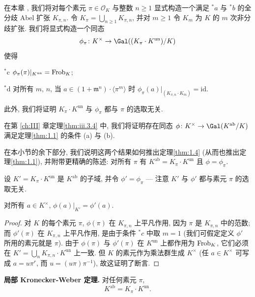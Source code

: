 在本章 , 我们将对每个素元 $\pi\in\mathcal{O}_K$ 与整数 $n\ge 1$ 显式构造一个满足 ${}^*a$ 与 ${}^*b$ 的全分歧 Abel 扩张 $K_{\pi,n}$. 令 $K_{\pi}=\bigcup_{n\ge 1}K_{\pi,n}$, 并对 $m\ge 1$ 令 $K_m$ 为 $K$ 的 $m$ 次非分歧扩张. 我们将显式构造一个同态
\[
\phi_{\pi}\colon K^{\times}\to\Gal((K_{\pi}\cdot K^{\mathrm{un}})/K)
\]
使得

${}^*\mathrm{c}$ $\phi_{\pi}(\pi)|_{K^{\mathrm{un}}}=\operatorname{Frob}_K$;

${}^*\mathrm{d}$ 对所有 $m$, $n$, 当 $a\in(1+\mathfrak{m}^n)\cdot\langle\pi^m\rangle$ 时 $\phi_{\pi}(a)|_{(K_{\pi,n}\cdot K_m)}=\mathrm{id}$.

此外, 我们将证明 $K_{\pi}\cdot K^{\mathrm{un}}$ 与 $\phi_{\pi}$ 都与 $\pi$ 的选取无关.

在第 \ref{ch:III} 章定理\ref{thm:iii.3.4} 中, 我们将证明存在同态 $\phi\colon K^{\times}\to\Gal(K^{\mathrm{ab}}/K)$ 满足定理\ref{thm:1.1} 的条件 (a) 与 (b).

在本小节的余下部分, 我们说明这两个结果如何推出定理\ref{thm:1.4} (从而也推出定理\ref{thm:1.1}), 并附带更精确的陈述: 对所有 $\pi$ 有 $K^{\mathrm{ab}}=K_{\pi}\cdot K^{\mathrm{un}}$ 且 $\phi=\phi_{\pi}$.

设 $K'=K_{\pi}\cdot K^{\mathrm{un}}$ 是 $K^{\mathrm{ab}}$ 的子域, 并令 $\phi'=\phi_{\pi}$ — 注意 $K'$ 与 $\phi'$ 都与素元 $\pi$ 的选取无关.

\begin{npara}\label{para:1.14}
对所有 $a\in K^{\times}$, $\phi(a)|_{K'}=\phi'(a)$.
\end{npara}

\begin{proof}
对 $K$ 的每个素元 $\pi$, $\phi(\pi)$ 在 $K_{\pi,n}$ 上平凡作用, 因为 $\pi$ 是 $K_{\pi,n}$ 中的范数; 而 $\phi'(\pi)$ 在 $K_{\pi,n}$ 上平凡作用, 是由于条件 ${}^*c$ 中取 $m=1$ (我们可假定定义 $\phi'$ 所用的素元就是 $\pi$). 由于 $\phi(\pi)$ 与 $\phi'(\pi)$ 在 $K^{\mathrm{un}}$ 上都作用为 $\operatorname{Frob}_K$, 它们必须在 $K'=\bigcup_n K_{\pi,n}\cdot K^{\mathrm{un}}$ 上一致. 但 $K$ 的素元作为乘法群生成 $K^{\times}$ (任 $a\in K^{\times}$ 可写成 $a=u\pi^r$, 而 $u=(u\pi)\pi^{-1}$), 故这证明了断言.
\end{proof}

\begin{npara}\label{para:1.15}
\textbf{局部 Kronecker-Weber 定理.} 对任何素元 $\pi$,
\[
K^{\mathrm{ab}}=K_{\pi}\cdot K^{\mathrm{un}}.
\]
\end{npara}

